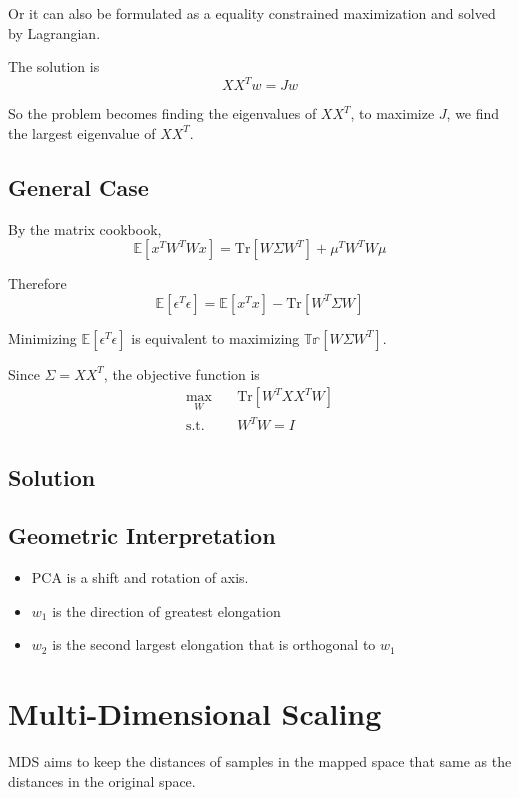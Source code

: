         Or it can also be formulated as a equality constrained maximization and solved by Lagrangian.

        The solution is
        \[ XX^Tw=Jw \]

        So the problem becomes finding the eigenvalues of $XX^T$, to maximize $J$, we find the largest eigenvalue of $XX^T$.

    \subsection{General Case}
        By the matrix cookbook,
        \[ \mathbb{E}[x^TW^TWx] = \mathrm{Tr}[W \Sigma W^T] + \mu^TW^TW\mu \]

        Therefore
        \[ \mathbb{E}[\epsilon^T\epsilon] = \mathbb{E}[x^Tx] - \mathrm{Tr}[W^T \Sigma W] \]

        Minimizing $\mathbb{E}[\epsilon^T\epsilon]$ is equivalent to maximizing $\mathbb{Tr}[W \Sigma W^T]$.

        Since $\Sigma = XX^T$, the objective function is
        \begin{align*}
            \max_W &\quad \mathrm{Tr}[W^TXX^TW]\\
            \text{s.t.} &\quad W^TW = I
        \end{align*}

    \subsection{Solution}
        

    \subsection{Geometric Interpretation}
        \begin{itemize}
            \item PCA is a shift and rotation of axis.
            \item $w_1$ is the direction of greatest elongation
            \item $w_2$ is the second largest elongation that is orthogonal to $w_1$
        \end{itemize}


\section{Multi-Dimensional Scaling}
    MDS aims to keep the distances of samples in the mapped space that same as the distances in the original space.

